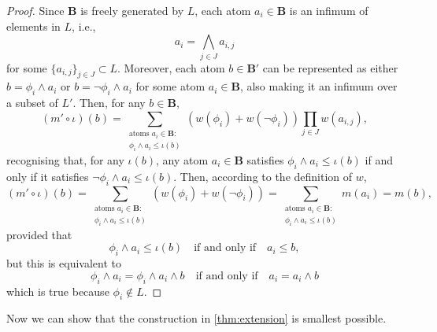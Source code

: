 \documentclass{article}
\theoremstyle{definition}
\theoremstyle{remark}
\begin{document}
\begin{proof} %
  Since $\mathbf{B}$ is freely generated by $L$, each atom $a_i \in \mathbf{B}$
  is an infimum of elements in $L$, i.e.,
  \[
    a_i = \bigwedge_{j \in J} a_{i,j}
  \]
  for some $\{ a_{i,j} \}_{j \in J} \subset L$. Moreover, each atom $b \in
  \mathbf{B'}$ can be represented as either $b = \phi_i \land a_i$ or $b =
  \neg\phi_i \land a_i$ for some atom $a_i \in \mathbf{B}$, also making it an
  infimum over a subset of $L'$. Then, for any $b \in \mathbf{B}$,
  \[
    (m' \circ \iota)(b) = \sum_{\substack{\text{atoms } a_i \in \mathbf{B}:\\
        \phi_i \land a_i \le \iota(b)}} (w(\phi_i) + w(\neg\phi_i)) \prod_{j \in
    J} w(a_{i,j}),
  \]
  recognising that, for any $\iota(b)$, any atom $a_i \in \mathbf{B}$ satisfies
  $\phi_i \land a_i \le \iota(b)$ if and only if it satisfies $\neg\phi_i \land
  a_i \le \iota(b)$. Then, according to the definition of $w$,
  \[
    (m' \circ \iota)(b) = \sum_{\substack{\text{atoms } a_i \in \mathbf{B}:\\
        \phi_i \land a_i \le \iota(b)}} (w(\phi_i) + w(\neg\phi_i)) =
    \sum_{\substack{\text{atoms } a_i \in \mathbf{B}:\\ \phi_i \land a_i \le
        \iota(b)}} m(a_i) = m(b),
  \]
  provided that
  \[
    \phi_i \land a_i \le \iota(b) \quad \text{if and only if} \quad a_i \le b,
  \]
  but this is equivalent to
  \[
    \phi_i \land a_i = \phi_i \land a_i \land b \quad \text{if and only if}
    \quad a_i = a_i \land b
  \]
  which is true because $\phi_i \not\in L$.
\end{proof}

Now we can show that the construction in \cref{thm:extension} is smallest
possible.
\end{document}

